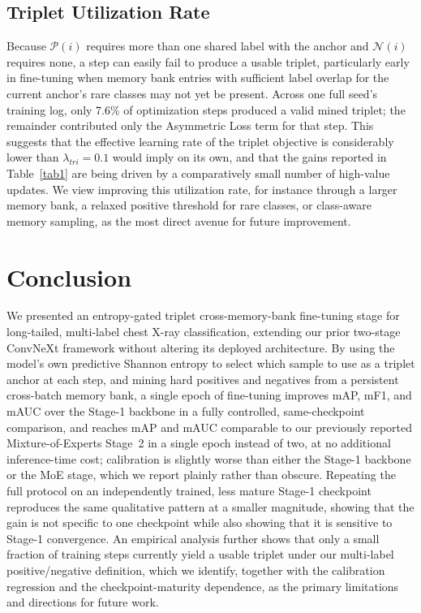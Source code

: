 \documentclass[conference]{IEEEtran}
\begin{document}
\subsection{Triplet Utilization Rate}
Because $\mathcal{P}(i)$ requires more than one shared label with the anchor and $\mathcal{N}(i)$ requires none, a step can easily fail to produce a usable triplet, particularly early in fine-tuning when memory bank entries with sufficient label overlap for the current anchor's rare classes may not yet be present. Across one full seed's training log, only 7.6\% of optimization steps produced a valid mined triplet; the remainder contributed only the Asymmetric Loss term for that step. This suggests that the effective learning rate of the triplet objective is considerably lower than $\lambda_{tri}{=}0.1$ would imply on its own, and that the gains reported in Table~\ref{tab1} are being driven by a comparatively small number of high-value updates. We view improving this utilization rate, for instance through a larger memory bank, a relaxed positive threshold for rare classes, or class-aware memory sampling, as the most direct avenue for future improvement.

\section{Conclusion}
We presented an entropy-gated triplet cross-memory-bank fine-tuning stage for long-tailed, multi-label chest X-ray classification, extending our prior two-stage ConvNeXt framework without altering its deployed architecture. By using the model's own predictive Shannon entropy to select which sample to use as a triplet anchor at each step, and mining hard positives and negatives from a persistent cross-batch memory bank, a single epoch of fine-tuning improves mAP, mF1, and mAUC over the Stage-1 backbone in a fully controlled, same-checkpoint comparison, and reaches mAP and mAUC comparable to our previously reported Mixture-of-Experts Stage~2 in a single epoch instead of two, at no additional inference-time cost; calibration is slightly worse than either the Stage-1 backbone or the MoE stage, which we report plainly rather than obscure. Repeating the full protocol on an independently trained, less mature Stage-1 checkpoint reproduces the same qualitative pattern at a smaller magnitude, showing that the gain is not specific to one checkpoint while also showing that it is sensitive to Stage-1 convergence. An empirical analysis further shows that only a small fraction of training steps currently yield a usable triplet under our multi-label positive/negative definition, which we identify, together with the calibration regression and the checkpoint-maturity dependence, as the primary limitations and directions for future work.
\end{document}
